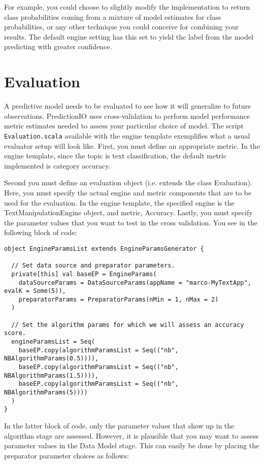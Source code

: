 \documentclass[a4paper,12pt]{article}
\renewcommand{\tt}[1]{\texttt{#1}}
\newcommand{\3}{\left}
\newcommand{\4}{\right}
\renewcommand{\-}[1]{{}^{-#1}}
\begin{document}
 For example, you could choose to slightly modify the implementation to return class probabilities coming from a mixture of model estimates for class probabilities, or any other technique you could conceive for combining your results. The default engine setting has this set to yield the label from the model predicting with greater confidence.
 
 
 
 \section*{Evaluation}
 
 A predictive model needs to be evaluated to see how it will generalize to future observations. PredictionIO uses cross-validation to perform model performance metric estimates needed to assess your particular choice of model. The script \tt{Evaluation.scala} available with the engine template exemplifies what a usual evaluator setup will look like. First, you must define an appropriate metric. In the engine template, since the topic is text classification, the default metric implemented is category accuracy. 

 Second you must define an evaluation object (i.e. extends the class Evaluation).
Here, you must specify the actual engine and metric components that are to be used for the evaluation. In the engine template, the specified engine is the TextManipulationEngine object, and metric, Accuracy. Lastly, you must specify the parameter values that you want to test in the cross validation. You see in the following block of code:

\break

\begin{verbatim}
object EngineParamsList extends EngineParamsGenerator {

  // Set data source and preparator parameters.
  private[this] val baseEP = EngineParams(
    dataSourceParams = DataSourceParams(appName = "marco-MyTextApp", evalK = Some(5)),
    preparatorParams = PreparatorParams(nMin = 1, nMax = 2)
  )

  // Set the algorithm params for which we will assess an accuracy score.
  engineParamsList = Seq(
    baseEP.copy(algorithmParamsList = Seq(("nb", NBAlgorithmParams(0.5)))),
    baseEP.copy(algorithmParamsList = Seq(("nb", NBAlgorithmParams(1.5)))),
    baseEP.copy(algorithmParamsList = Seq(("nb", NBAlgorithmParams(5))))
  )
}
\end{verbatim}
In the latter block of code, only the parameter values that show up in the algorithm stage are assessed. However, it is plausible that you may want to assess parameter values in the Data Model stage. This can easily be done by placing the preparator parameter choices as follows:
\end{document}
